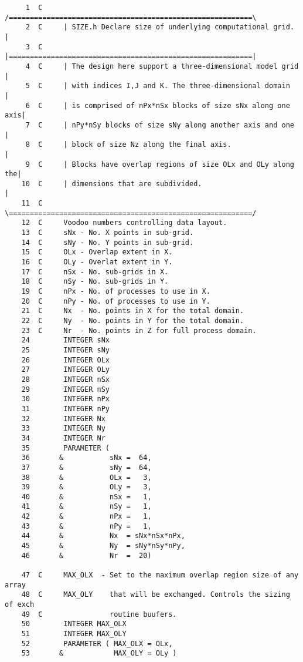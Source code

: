 \begin{verbatim}
     1	C     /==========================================================\
     2	C     | SIZE.h Declare size of underlying computational grid.    |
     3	C     |==========================================================|
     4	C     | The design here support a three-dimensional model grid   |
     5	C     | with indices I,J and K. The three-dimensional domain     |
     6	C     | is comprised of nPx*nSx blocks of size sNx along one axis|
     7	C     | nPy*nSy blocks of size sNy along another axis and one    |
     8	C     | block of size Nz along the final axis.                   |
     9	C     | Blocks have overlap regions of size OLx and OLy along the|
    10	C     | dimensions that are subdivided.                          |
    11  C     \==========================================================/
    12  C     Voodoo numbers controlling data layout.
    13  C     sNx - No. X points in sub-grid.
    14  C     sNy - No. Y points in sub-grid.
    15  C     OLx - Overlap extent in X.
    16  C     OLy - Overlat extent in Y.
    17  C     nSx - No. sub-grids in X.
    18  C     nSy - No. sub-grids in Y.
    19  C     nPx - No. of processes to use in X.
    20  C     nPy - No. of processes to use in Y.
    21  C     Nx  - No. points in X for the total domain.
    22  C     Ny  - No. points in Y for the total domain.
    23  C     Nr  - No. points in Z for full process domain.
    24        INTEGER sNx
    25        INTEGER sNy
    26        INTEGER OLx
    27        INTEGER OLy
    28        INTEGER nSx
    29        INTEGER nSy
    30        INTEGER nPx
    31	      INTEGER nPy
    32	      INTEGER Nx
    33	      INTEGER Ny
    34	      INTEGER Nr
    35	      PARAMETER (
    36	     &           sNx =  64,
    37	     &           sNy =  64,
    38	     &           OLx =   3,
    39	     &           OLy =   3,
    40	     &           nSx =   1,
    41	     &           nSy =   1,
    42	     &           nPx =   1,
    43	     &           nPy =   1,
    44	     &           Nx  = sNx*nSx*nPx,
    45	     &           Ny  = sNy*nSy*nPy,
    46	     &           Nr  =  20)

    47	C     MAX_OLX  - Set to the maximum overlap region size of any array
    48	C     MAX_OLY    that will be exchanged. Controls the sizing of exch
    49	C                routine buufers.
    50	      INTEGER MAX_OLX
    51	      INTEGER MAX_OLY
    52	      PARAMETER ( MAX_OLX = OLx,
    53	     &            MAX_OLY = OLy )

\end{verbatim}